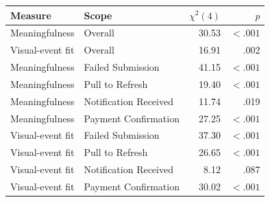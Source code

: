\begin{appendixtable}
\centering
\small
\caption{Omnibus repeated-measures tests.}
\label{tab:omnibus-tests}
\begin{singlespace}
\renewcommand{\arraystretch}{1.1}
\begin{tabular}{@{}>{\raggedright\arraybackslash}p{1.6in}>{\raggedright\arraybackslash}p{1.15in}rr@{}}
\hline
\textbf{Measure} & \textbf{Scope} & \textbf{$\chi^2(4)$} & \textbf{$p$} \\
\hline
Meaningfulness & Overall & 30.53 & $<.001$ \\
Visual-event fit & Overall & 16.91 & .002 \\
Meaningfulness & Failed Submission & 41.15 & $<.001$ \\
Meaningfulness & Pull to Refresh & 19.40 & $<.001$ \\
Meaningfulness & Notification Received & 11.74 & .019 \\
Meaningfulness & Payment Confirmation & 27.25 & $<.001$ \\
Visual-event fit & Failed Submission & 37.30 & $<.001$ \\
Visual-event fit & Pull to Refresh & 26.65 & $<.001$ \\
Visual-event fit & Notification Received & 8.12 & .087 \\
Visual-event fit & Payment Confirmation & 30.02 & $<.001$ \\
\hline
\end{tabular}
\end{singlespace}
\end{appendixtable}
